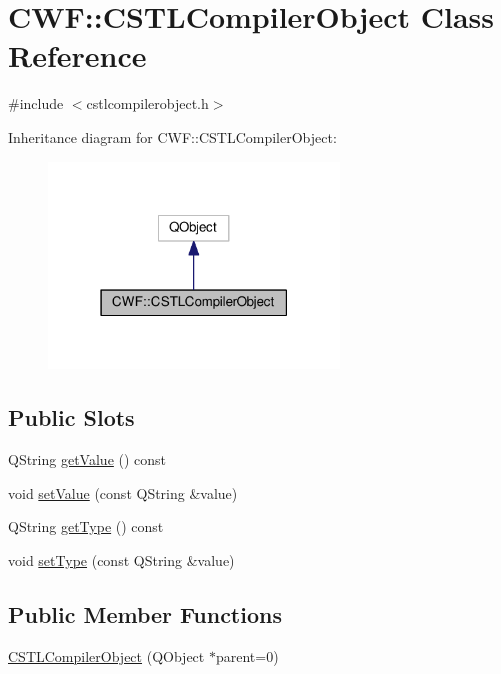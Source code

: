 \hypertarget{class_c_w_f_1_1_c_s_t_l_compiler_object}{\section{C\+W\+F\+:\+:C\+S\+T\+L\+Compiler\+Object Class Reference}
\label{class_c_w_f_1_1_c_s_t_l_compiler_object}
}


{\ttfamily \#include $<$cstlcompilerobject.\+h$>$}



Inheritance diagram for C\+W\+F\+:\+:C\+S\+T\+L\+Compiler\+Object\+:
\nopagebreak
\begin{figure}[H]
\begin{center}
\leavevmode
\includegraphics[width=219pt]{class_c_w_f_1_1_c_s_t_l_compiler_object__inherit__graph}
\end{center}
\end{figure}
\subsection*{Public Slots}
\begin{DoxyCompactItemize}
\item 
Q\+String \hyperlink{class_c_w_f_1_1_c_s_t_l_compiler_object_a92137c536b356e4f6eeb76a3c1b65e54}{get\+Value} () const 
\item 
void \hyperlink{class_c_w_f_1_1_c_s_t_l_compiler_object_acf0a476bd687e47edb169c480193654f}{set\+Value} (const Q\+String \&value)
\item 
Q\+String \hyperlink{class_c_w_f_1_1_c_s_t_l_compiler_object_ac7cd5fe07f3b71e0d4b6342db1a4cd29}{get\+Type} () const 
\item 
void \hyperlink{class_c_w_f_1_1_c_s_t_l_compiler_object_a51e99c46daee9cb1f14088d69d2d4e0e}{set\+Type} (const Q\+String \&value)
\end{DoxyCompactItemize}
\subsection*{Public Member Functions}
\begin{DoxyCompactItemize}
\item 
\hyperlink{class_c_w_f_1_1_c_s_t_l_compiler_object_a1c20bd083beceaaef00fcaf10f9e061c}{C\+S\+T\+L\+Compiler\+Object} (Q\+Object $\ast$parent=0)
\end{DoxyCompactItemize}


